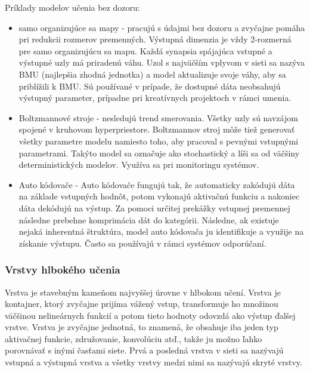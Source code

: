 Príklady modelov učenia bez dozoru:
\begin{itemize}
  \item samo organizujúce sa mapy - pracujú s údajmi bez dozoru a zvyčajne pomáha pri redukcii rozmerov premenných. Výstupná dimenzia je vždy 2-rozmerná pre samo organizujúcu sa mapu. Každá synapsia spájajúca vstupné a výstupné uzly má priradenú váhu. Uzol s najväčším vplyvom v sieti sa nazýva BMU (najlepšia zhodná jednotka) a model aktualizuje svoje váhy, aby sa priblížili k BMU. Sú používané v prípade, že dostupné dáta neobsahujú výstupný parameter, prípadne pri kreatívnych projektoch v rámci umenia.
  \item Boltzmannové stroje - nesledujú trend smerovania. Všetky uzly sú navzájom spojené v kruhovom hyperpriestore. Boltzmannov stroj môže tiež generovať všetky parametre modelu namiesto toho, aby pracoval s pevnými vstupnými parametrami. Takýto model sa označuje ako stochastický a líši sa od väčšiny deterministických modelov. Využíva sa pri monitoringu systémov.
  \item Auto kódovače - Auto kódovače fungujú tak, že automaticky zakódujú dáta na základe vstupných hodnôt, potom vykonajú aktivačnú funkciu a nakoniec dáta dekódujú na výstup. Za pomoci určitej prekážky vstupnej premennej následne prebehne komprimácia dát do kategórii. Následne, ak existuje nejaká inherentná štruktúra, model auto kódovača ju identifikuje a využije na získanie výstupu. Často sa používajú v rámci systémov odporúčaní.
\end{itemize}



\subsubsection{Vrstvy hlbokého učenia}
Vrstva je stavebným kameňom najvyššej úrovne v hlbokom učení. Vrstva je kontajner, ktorý zvyčajne prijíma vážený vstup, transformuje ho množinou väčšinou nelineárnych funkcií a potom tieto hodnoty odovzdá ako výstup ďalšej vrstve. Vrstva je zvyčajne jednotná, to znamená, že obsahuje iba jeden typ aktivačnej funkcie, združovanie, konvolúciu atď., takže ju možno ľahko porovnávať s inými časťami siete. Prvá a posledná vrstva v sieti sa nazývajú vstupná a výstupná vrstva a všetky vrstvy medzi nimi sa nazývajú skryté vrstvy.

